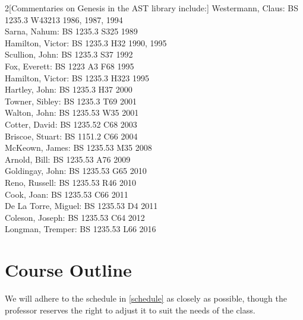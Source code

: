 \documentclass[titlepage]{article}
\begin{document}
\begin{multicols}{2}[Commentaries on Genesis in the AST library include:]
Westermann, Claus: {\scshape BS 1235.3 W43213 1986, 1987, 1994}\\
Sarna, Nahum: {\scshape BS 1235.3 S325 1989}\\
Hamilton, Victor: {\scshape BS 1235.3 H32 1990, 1995}\\
Scullion, John: {\scshape BS 1235.3 S37 1992}\\
Fox, Everett: {\scshape BS 1223 A3 F68 1995}\\
Hamilton, Victor: {\scshape BS 1235.3 H323 1995}\\
Hartley, John: {\scshape BS 1235.3 H37 2000}\\
Towner, Sibley: {\scshape BS 1235.3 T69 2001}\\
Walton, John: {\scshape BS 1235.53 W35 2001}\\
Cotter, David: {\scshape BS 1235.52 C68 2003}\\
Briscoe, Stuart: {\scshape BS 1151.2 C66 2004}\\
McKeown, James: {\scshape BS 1235.53 M35 2008}\\
Arnold, Bill: {\scshape BS 1235.53 A76 2009}\\
Goldingay, John: {\scshape BS 1235.53 G65 2010}\\
Reno, Russell: {\scshape BS 1235.53 R46 2010}\\
Cook, Joan: {\scshape BS 1235.53 C66 2011}\\
De La Torre, Miguel: {\scshape BS 1235.53 D4 2011}\\
Coleson, Joseph: {\scshape BS 1235.53 C64 2012}\\
Longman, Tremper: {\scshape BS 1235.53 L66 2016}
\end{multicols}

\section{Course Outline}
\label{outline}

We will adhere to the schedule in \autoref{schedule} as closely as
possible, though the professor reserves the right to adjust it to suit
the needs of the class.
\end{document}
